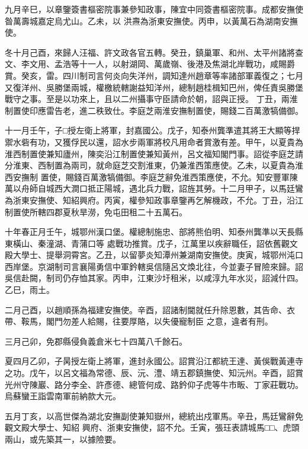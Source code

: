 \begin{pinyinscope}
 九月辛巳，以章鑒簽書樞密院事兼參知政事，陳宜中同簽書樞密院事。成都安撫使昝萬壽城嘉定烏尤山。乙未，以
 洪燾為浙東安撫使。丙申，以黃萬石為湖南安撫使。



 冬十月己酉，來歸人汪福、許文政各官五轉。癸丑，鎮巢軍、和州、太平州諸將查文、李文用、孟浩等十一人，以射湖岡、萬歲嶺、後港及焦湖北岸戰功，咸賜爵賞。癸亥，雷。四川制司言何炎向失洋州，調知達州趙章等率諸部軍義復之；七月又復洋州、吳勝堡兩城，權檄統轄謝益知洋州，總制趙桂楫知巴州，俾任責吳勝堡戰守之事。至是以功來上，且以二州攝事守臣請命於朝，詔與正授。
 丁丑，兩淮制置使印應雷告老，進二秩致仕。李庭芝兩淮安撫制置使，賜錢二百萬激犒備御。



 十一月壬午，子□授左衛上將軍，封嘉國公。戊子，知泰州龔準遣其將王大顯等捍禦水砦有功，又獲俘民以還，詔水步兩軍將校凡用命者賞激有差。甲午，以夏貴為淮西制置使兼知廬州，陳奕沿江制置使兼知黃州，呂文福知閣門事。詔從李庭芝請分淮東、西制置為兩司，就命庭芝交割淮東，仍兼淮西策應使。乙未，以夏貴為淮西安撫制
 置使，賜錢百萬激犒備御。李庭芝辭免淮西策應使，不允。知安豐軍陳萬以舟師自城西大澗口抵正陽城，遇北兵力戰，詔旌其勞。十二月甲子，以馬廷鸞為浙東安撫使、知紹興府。丙寅，權參知政事章鑒再乞解機政，不允。丁丑，沿江制置使所轄四郡夏秋旱澇，免屯田租二十五萬石。



 十年春正月壬午，城鄂州漢口堡。權總制施忠、部將熊伯明、知泰州龔準以天長縣東橫山、秦潼湖、青蒲口等
 處戰功推賞。戊子，江萬里以疾辭職任，詔依舊觀文殿大學士、提舉洞霄宮。乙丑，以留夢炎知潭州兼湖南安撫使。庚寅，城鄂州沌口西岸堡。京湖制司言襄陽勇信中軍鈐轄吳信隨呂文煥北往，今並妻子冒險來歸。詔吳信赴闕，制司仍存恤其家。丙申，江東沙圩租米，以咸淳九年水災，詔減什四。乙巳，雨土。



 二月己酉，以趙順孫為福建安撫使。辛酉，詔諸制閫就任升除恩數，其告命、衣帶、鞍馬，閣門勿差人給賜，往要厚賂，以失優寵制臣
 之意，違者有刑。



 三月己卯，免郡縣侵負義倉米七十四萬八千餘石。



 夏四月乙卯，子昺授左衛上將軍，進封永國公。詔賞沿江都統王達、黃俁戰黃連寺之功。戊午，以呂文福為常德、辰、沅、澧、靖五郡鎮撫使、知沅州。辛酉，詔賞光州守陳巖、路分李全、許彥德、總管何成、路鈐仰子虎等牛市畈、丁家莊戰功。烏蘇蠻王詣雲南軍前納款大元。



 五月丁亥，以高世傑為湖北安撫副使兼知嶽州，總統出戍軍馬。辛丑，馬廷鸞辭免觀文殿大學士、知紹
 興府、浙東安撫使，詔不允。壬寅，張玨表請城馬□□、虎頭兩山，或先築其一，以據險要。




\end{pinyinscope}
